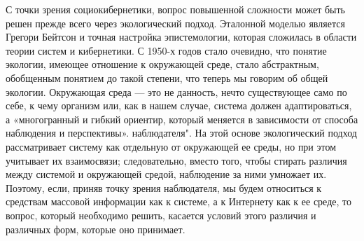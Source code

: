\documentclass[a4page]{article}
\begin{document}
С точки зрения социокибернетики, вопрос повышенной сложности может быть решен прежде всего через экологический подход. Эталонной моделью является Грегори Бейтсон\cite{steps_to_ecology_of_mind} и точная настройка эпистемологии, которая сложилась в области теории систем и кибернетики. С 1950-х годов стало очевидно, что понятие экологии, имеющее отношение к окружающей среде, стало абстрактным, обобщенным понятием до такой степени, что теперь мы говорим об общей экологии. Окружающая среда — это не данность, нечто существующее само по себе, к чему организм или, как в нашем случае, система должен адаптироваться, а «многогранный и гибкий ориентир, который меняется в зависимости от способа наблюдения и перспективы». наблюдателя"\cite{ecology_of_differences}. На этой основе экологический подход рассматривает систему как отдельную от окружающей ее среды, но при этом учитывает их взаимосвязи; следовательно, вместо того, чтобы стирать различия между системой и окружающей средой, наблюдение за ними умножает их. Поэтому, если, приняв точку зрения наблюдателя, мы будем относиться к средствам массовой информации как к системе, а к Интернету как к ее среде, то вопрос, который необходимо решить, касается условий этого различия и различных форм, которые оно принимает.
\end{document}
